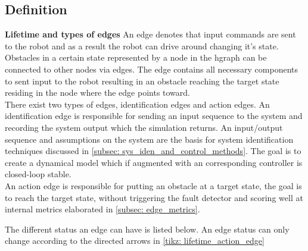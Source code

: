 \subsection{Definition}
\label{subsec: hgraph_definition}




\textbf{Lifetime and types of edges}
\newline
An edge denotes that input commands are sent to the robot and as a result the robot can drive around changing it's state. Obstacles in a certain state represented by a node in the hgraph can be connected to other nodes via edges.
The edge contains all necessary components to sent input to the robot resulting in an obstacle reaching the target state residing in the node where the edge points toward. \\

There exist two types of edges, identification edges and action edges. An identification edge is responsible for sending an input sequence to the system and recording the system output which the simulation returns. An input/output sequence and assumptions on the system are the basis for system identification techniques discussed in \cref{subsec: sys_iden_and_control_methods}. The goal is to create a dynamical model which if augmented with an corresponding controller is closed-loop stable. \\

An action edge is responsible for putting an obstacle at a target state, the goal is to reach the target state, without triggering the fault detector and scoring well at internal metrics elaborated in \cref{subsec: edge_metrics}.


The different status an edge can have is listed below. An edge status can only change according to the directed arrows in \cref{tikz: lifetime_action_edge}



